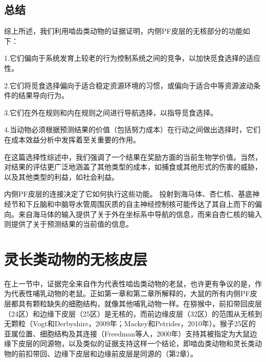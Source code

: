 \subsection{总结}
综上所述，我们利用啮齿类动物的证据证明，内侧PF皮层的无核部分的功能如下：\par
1.它们偏向于系统发育上较老的行为控制系统之间的竞争，以加快觅食选择的适应性。\par
2.它们将觅食选择偏向于适合稳定资源环境的习惯，或偏向于适合中等资源波动条件的结果导向行为。\par
3.它们在外在规则和内在规则之间进行导航选择，以指导觅食选择。\par
4.当动物必须根据预测结果的价值（包括努力成本）在行动之间做出选择时，它们在成本效益分析中发挥着至关重要的作用。\par
在这篇选择性综述中，我们强调了一个结果在奖励方面的当前生物学价值。当然，对结果的评估更广泛地涵盖了其他类型的成本，如捕食或其他形式的伤害的威胁，以及其他类型的利益，如社会利益。\par
内侧PF皮层的连接决定了它如何执行这些功能。
投射到海马体、杏仁核、基底神经节和下丘脑和中脑导水管周围灰质的自主神经控制核可能传达了其自上而下的偏向。来自海马体的输入提供了关于外在坐标系中导航的信息，而来自杏仁核的输入则提供了关于预测结果的当前值的信息。\par
\section{灵长类动物的无核皮层}
在上一节中，证据完全来自作为代表性啮齿类动物的老鼠，也许更有争议的是，作为代表性哺乳动物的老鼠。正如第一章和第二章所解释的，大鼠的所有内侧PF皮层都具有颗粒缺失的细胞结构，就像其他哺乳动物一样。在猕猴中，前扣带回皮层（24区）和边缘下皮层（25区）是无核的，而前边缘皮层（32区）的范围从无核到无颗粒（Vogt和Derbyshire，2009年；Mackey和Petrides，2010年）。猴子25区的亚属位置、细胞结构及其连接（Freedman等人，2000年）支持其被指定为大鼠边缘下皮层的同源物，以及类似的证据支持这样一个结论，即啮齿类动物和灵长类动物的前扣带回、边缘下皮层和边缘前皮层是同源的（第2章）。\par
